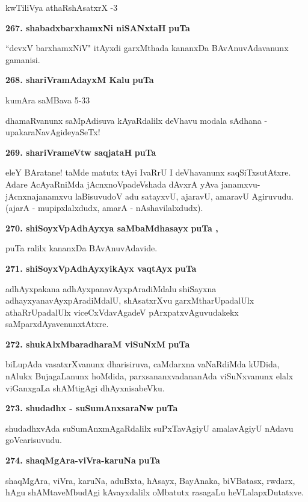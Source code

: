 \hfill{kwTiliVya athaRshAsatxrX -3}

\medskip
\noindent
\textbf{267. shabadxbarxhamxNi niSANxtaH} \hfill{\bf puTa \pageref{160}}

\smallskip
``devxV barxhamxNiV" itAyxdi garxMthada kananxDa BAvAnuvAdavanunx gamanisi.

\medskip
\noindent
\textbf{268. shariVramAdayxM Kalu} \hfill{\bf puTa \pageref{77}}

\hfill{kumAra saMBava 5-33}

\smallskip
dhamaRvanunx saMpAdisuva kAyaRdalilx deVhavu modala sAdhana - upakaraNavAgideyaSeTx!

\medskip
\noindent
\textbf{269. shariVrameVtw saqjataH} \hfill{\bf puTa \pageref{91}}

\smallskip
eleY BAratane! taMde matutx tAyi IvaRrU I deVhavanunx saqSiTxsutAtxre. Adare AcAyaRniMda jAcnxnoVpadeVshada dAvxrA yAva janamxvu-jAcnxnajanamxvu laBisuvudoV adu satayxvU, ajaravU, amaravU Agiruvudu. (ajarA - mupipxlalxdudx, amarA - nAshavilalxdudx).


\medskip
\noindent
\textbf{270. shiSoyxVpAdhAyxya saMbaMdhasayx} \hfill{\bf puTa \pageref{38}, \pageref{83}}

\smallskip
puTa \pageref{38}ralilx kananxDa BAvAnuvAdavide.

\eject

\noindent
\textbf{271. shiSoyxVpAdhAyxyikAyx vaqtAyx} \hfill{\bf puTa \pageref{105}}

\smallskip
adhAyxpakana adhAyxpanavAyxpAradiMdalu shiSayxna adhayxyanavAyxpAradiMdalU, shAsatxrXvu garxMtha\-rUpa\-da\-lUlx athaRrUpadalUlx viceCxVdavAgadeV pArxpatxvAguvudakekx saMparxdAyavenunxtAtxre.

\medskip
\noindent
\textbf{272. shukAlxMbaradharaM viSuNxM} \hfill{\bf puTa \pageref{206}}

\smallskip
biLupAda vasatxrXvanunx dharisiruva, caMdarxna vaNaRdiMda kUDida, nAlukx BujagaLanunx hoMdida, parxsananx\-vadananAda viSuNxvanunx elalx viGanxgaLa shAMtigAgi dhAyxnisabeVku.

\medskip
\noindent
\textbf{273. shudadhx - suSumAnxsaraNw} \hfill{\bf puTa \pageref{157e}}

\smallskip
shudadhxvAda suSumAnxmAgaRdalilx suPxTavAgiyU amalavAgiyU nAdavu goVcarisuvudu.

\medskip
\noindent
\textbf{274. shaqMgAra-viVra-karuNa} \hfill{\bf puTa \pageref{230}}

\smallskip
shaqMgAra, viVra, karuNa, aduBxta, hAsayx, BayAnaka, biVBatasx, rwdarx, hAgu shAMtaveMbudAgi kAvayx\-dalilx oMbatutx rasagaLu heVLalapxDutatxve.

